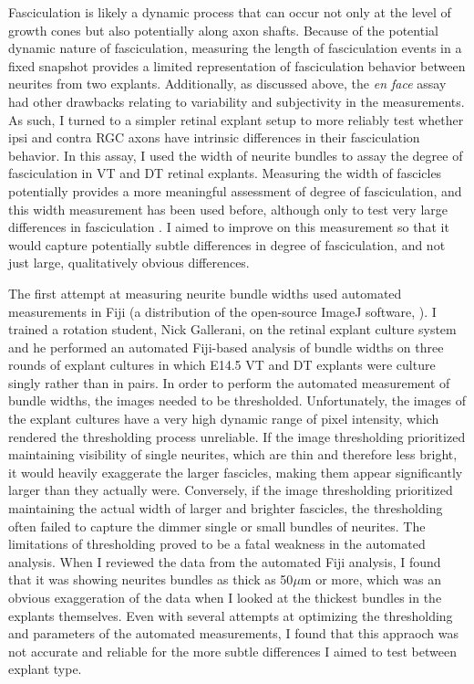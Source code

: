 \label{sec:BundleWidth}
Fasciculation is likely a dynamic process that can occur not only at the level of growth cones but also potentially along axon shafts.
Because of the potential dynamic nature of fasciculation, measuring the length of fasciculation events in a fixed snapshot provides a limited representation of fasciculation behavior between neurites from two explants.
Additionally, as discussed above, the \emph{en face} assay had other drawbacks relating to variability and subjectivity in the measurements.
As such, I turned to a simpler \invitro{} retinal explant setup to more reliably test whether ipsi and contra RGC axons have intrinsic differences in their fasciculation behavior.
In this assay, I used the width of neurite bundles to assay the degree of fasciculation in VT and DT retinal explants.
Measuring the width of fascicles potentially provides a more meaningful assessment of degree of fasciculation, and this width measurement has been used before, although only to test very large differences in fasciculation \cite{jaworski2012autocrine}.
I aimed to improve on this measurement so that it would capture potentially subtle differences in degree of fasciculation, and not just large, qualitatively obvious differences.

The first attempt at measuring neurite bundle widths used automated measurements in Fiji (a distribution of the open-source ImageJ software, ).
I trained a rotation student, Nick Gallerani, on the retinal explant culture system and he performed an automated Fiji-based analysis of bundle widths on three rounds of explant cultures in which E14.5 VT and DT explants were culture singly rather than in pairs.
In order to perform the automated measurement of bundle widths, the images needed to be thresholded.
Unfortunately, the images of the explant cultures have a very high dynamic range of pixel intensity, which rendered the thresholding process unreliable.
If the image thresholding prioritized maintaining visibility of single neurites, which are thin and therefore less bright, it would heavily exaggerate the larger fascicles, making them appear significantly larger than they actually were.
Conversely, if the image thresholding prioritized maintaining the actual width of larger and brighter fascicles, the thresholding often failed to capture the dimmer single or small bundles of neurites.
The limitations of thresholding proved to be a fatal weakness in the automated analysis.
When I reviewed the data from the automated Fiji analysis, I found that it was showing neurites bundles as thick as 50$\mu$m or more, which was an obvious exaggeration of the data when I looked at the thickest bundles in the explants themselves.
Even with several attempts at optimizing the thresholding and parameters of the automated measurements, I found that this appraoch was not accurate and reliable for the more subtle differences I aimed to test between explant type.

